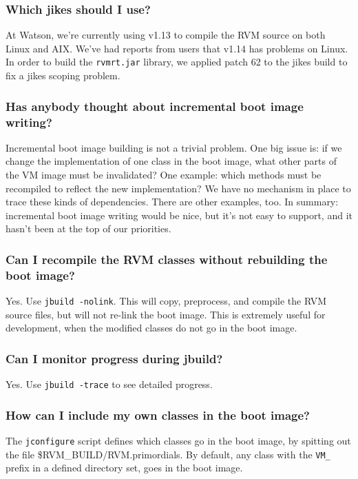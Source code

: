 \subsubsection{Which jikes should I use?}
At Watson, we're currently using 
 v1.13 to compile the RVM source on
both Linux and AIX.  We've had reports from users that v1.14 has problems
on Linux.  In order to build the {\tt rvmrt.jar} library, we applied 
patch 62
to the jikes build to fix a jikes scoping problem.


\subsubsection{Has anybody thought about incremental boot image writing?}

Incremental boot image building is not a trivial problem.  One big
issue is: if we change the implementation of one class in the boot image,
what other parts of the VM image must be invalidated?  One example: which
methods must be recompiled to reflect the new implementation?  We have no
mechanism in place to trace these kinds of dependencies.  There are other
examples, too.  In summary: incremental boot image writing would be nice,
but it's not easy to support, and it hasn't been at the top of our
priorities.

\subsubsection{Can I recompile the RVM classes without rebuilding the boot
image?}

Yes.  Use {\tt jbuild -nolink}. This will copy, preprocess, and compile
the RVM source files, but will not re-link the boot image.  This is
extremely useful for development, when the modified classes do not go in
the boot image.

\subsubsection{Can I monitor progress during jbuild?}

Yes.  Use {\tt jbuild -trace} to see detailed progress. 

\subsubsection{How can I include my own classes in the boot image?}

The {\tt jconfigure} script defines which classes go in the boot image, by
spitting out the file {\$RVM\_BUILD/RVM.primordials}.  By default, any
class with the {\tt VM\_} prefix in a defined directory set, goes in the
boot image.

